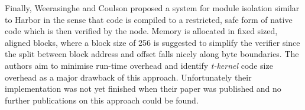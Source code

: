 Finally, Weerasinghe and Coulson \cite{Weerasinghe:2008kh} proposed a system for module isolation similar to Harbor in the sense that code is compiled to a restricted, safe form of native code which is then verified by the node. Memory is allocated in fixed sized, aligned blocks, where a block size of 256 is suggested to simplify the verifier since the split between block address and offset falls nicely along byte boundaries. The authors aim to minimise run-time overhead and identify \emph{t-kernel} code size overhead as a major drawback of this approach. Unfortunately their implementation was not yet finished when their paper was published and no further publications on this approach could be found.
